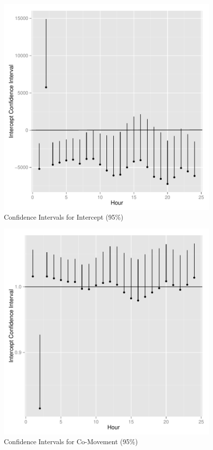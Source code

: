 \documentclass{article}
\begin{document}
\begin{figure}
\begin{center}
\caption{Confidence Intervals for Intercept (95\%)}
\includegraphics{DraftPaper-003}
\end{center}
\end{figure}



\begin{figure}
\begin{center}
\caption{Confidence Intervals for Co-Movement (95\%)}
\includegraphics{DraftPaper-004}
\end{center}
\end{figure}
\end{document}
